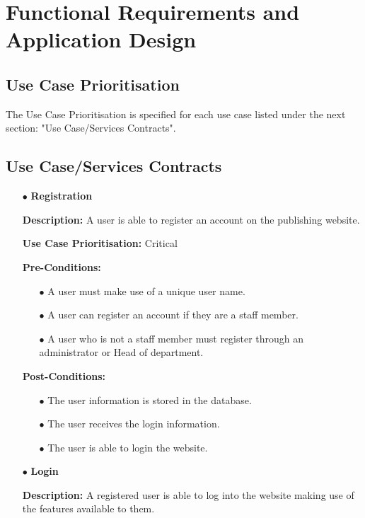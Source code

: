 \documentclass[a4paper,12pt]{article}
\begin{document}
\newpage
\section{Functional Requirements and Application Design}
\subsection{Use Case Prioritisation}
The Use Case Prioritisation is specified for each use case listed under the next section: "Use Case/Services Contracts".
\subsection{Use Case/Services Contracts}
\begin{itemize}
	\item[$\bullet$]\textbf{Registration}\newline

	\textbf{Description:} A user is able to register an account on the publishing website.\newline
	
	\textbf{Use Case Prioritisation:} Critical\newline

	\textbf{Pre-Conditions:}
	\begin{itemize}
		\item[$\bullet$]A user must make use of a unique user name.
		\item[$\bullet$]A user can register an account if they are a staff member.
		\item[$\bullet$]A user who is not a staff member must register through an administrator or Head of department.
		\\
	\end{itemize}
	\textbf{Post-Conditions: }
	\begin{itemize}
		\item[$\bullet$]The user information is stored in the database.
		\item[$\bullet$]The user receives the login information.
		\item[$\bullet$]The user is able to login the website.
		\\
	\end{itemize}
	\newpage
	\item[$\bullet$]\textbf{Login}\newline

	\textbf{Description:} A registered user is able to log into the website making use of the features available to them.\newline
	

\end{itemize}
\end{document}
